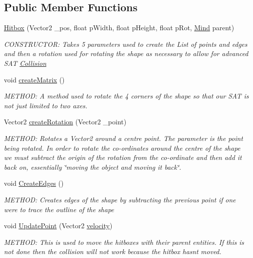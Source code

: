 \subsection*{Public Member Functions}
\begin{DoxyCompactItemize}
\item 
\hyperlink{a00506_a0dd1189ee2d37a3401501ca1f10b9cfa}{Hitbox} (Vector2 \+\_\+pos, float p\+Width, float p\+Height, float p\+Rot, \hyperlink{a00318}{Mind} parent)
\begin{DoxyCompactList}\small\item\em C\+O\+N\+S\+T\+R\+U\+C\+T\+OR\+: Takes 5 parameters used to create the List of points and edges and then a rotation used for rotating the shape as necessary to allow for advanced S\+AT \hyperlink{a00268}{Collision} \end{DoxyCompactList}\item 
void \hyperlink{a00506_ab91473c67469cf0be5069c1ca9a2d6fb}{create\+Matrix} ()
\begin{DoxyCompactList}\small\item\em M\+E\+T\+H\+OD\+: A method used to rotate the 4 corners of the shape so that our S\+AT is not just limited to two axes. \end{DoxyCompactList}\item 
Vector2 \hyperlink{a00506_ae78ae27deafc11bf87c1396c504ce621}{create\+Rotation} (Vector2 \+\_\+point)
\begin{DoxyCompactList}\small\item\em M\+E\+T\+H\+OD\+: Rotates a Vector2 around a centre point. The parameter is the point being rotated. In order to rotate the co-\/ordinates around the centre of the shape we must subtract the origin of the rotation from the co-\/ordinate and then add it back on, essentially \char`\"{}moving the object and moving it back\char`\"{}. \end{DoxyCompactList}\item 
void \hyperlink{a00506_a6bc6facadaf82a8c49979e35f0c8b132}{Create\+Edges} ()
\begin{DoxyCompactList}\small\item\em M\+E\+T\+H\+OD\+: Creates edges of the shape by subtracting the previous point if one were to trace the outline of the shape \end{DoxyCompactList}\item 
void \hyperlink{a00506_ab5cba73c16189f63616a91cf19f00562}{Update\+Point} (Vector2 \hyperlink{a00506_a4bfe4a9151e1af19d18f92b4cfba46b6}{velocity})
\begin{DoxyCompactList}\small\item\em M\+E\+T\+H\+OD\+: This is used to move the hitboxes with their parent entities. If this is not done then the collision will not work because the hitbox hasn\textquotesingle{}t moved. \end{DoxyCompactList}\item 

\end{DoxyCompactItemize}
